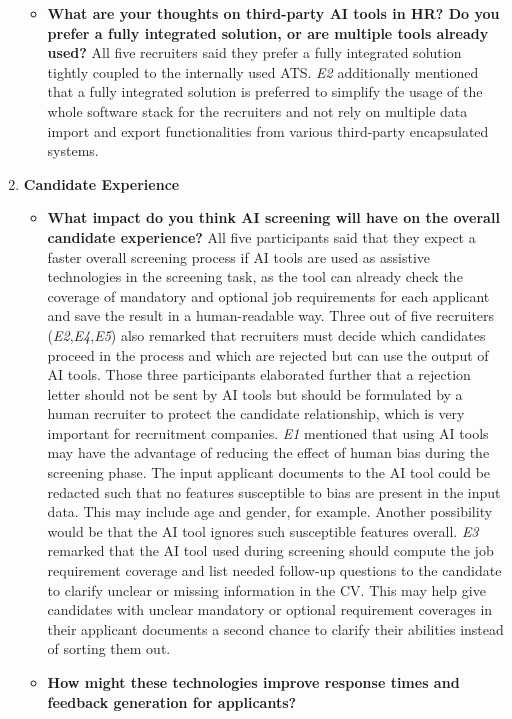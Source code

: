 \documentclass[draft,final]{thesisclass} %
\begin{document}
\begin{enumerate}
\begin{itemize}
        \item \textbf{What are your thoughts on third-party \acs{AI} tools in \acs{HR}? Do you prefer a fully integrated solution, or are multiple tools already used?}
        All five recruiters said they prefer a fully integrated solution tightly coupled to the internally used \acs{ATS}.
        \textit{E2} additionally mentioned that a fully integrated solution is preferred to simplify the usage of the whole software stack for the recruiters and not rely on multiple data import and export functionalities from various third-party encapsulated systems.
    \end{itemize}
    \item \textbf{Candidate Experience} \label{candidate_experience}
    \begin{itemize}
        \item \textbf{What impact do you think \acs{AI} screening will have on the overall candidate experience?}
        All five participants said that they expect a faster overall screening process if \acs{AI} tools are used as assistive technologies in the screening task, as the tool can already check the coverage of mandatory and optional job requirements for each applicant and save the result in a human-readable way. Three out of five recruiters (\textit{E2},\textit{E4},\textit{E5}) also remarked that recruiters must decide which candidates proceed in the process and which are rejected but can use the output of \acs{AI} tools. Those three participants elaborated further that a rejection letter should not be sent by \acs{AI} tools but should be formulated by a human recruiter to protect the candidate relationship, which is very important for recruitment companies. \textit{E1} mentioned that using \acs{AI} tools may have the advantage of reducing the effect of human bias during the screening phase. The input applicant documents to the \acs{AI} tool could be redacted such that no features susceptible to bias are present in the input data. This may include age and gender, for example. Another possibility would be that the \acs{AI} tool ignores such susceptible features overall. \textit{E3} remarked that the \acs{AI} tool used during screening should compute the job requirement coverage and list needed follow-up questions to the candidate to clarify unclear or missing information in the \acs{CV}. This may help give candidates with unclear mandatory or optional requirement coverages in their applicant documents a second chance to clarify their abilities instead of sorting them out.
        \item \textbf{How might these technologies improve response times and feedback generation for applicants?}

\end{itemize}
\end{enumerate}
\end{document}
